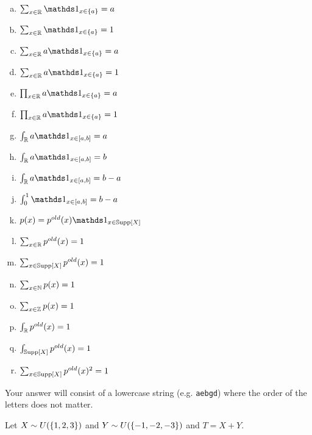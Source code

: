 \documentclass[12pt,landscape]{article}
\newcommand{\instr}{\small Your answer will consist of a lowercase string (e.g. \texttt{aebgd}) where the order of the letters does not matter. \normalsize}
\begin{document}
\begin{enumerate}[(a)]
\item $\sum_{x \in \reals} \indic{x \in \braces{a}} = a$
\item $\sum_{x \in \reals} \indic{x \in \braces{a}} = 1$
\item $\sum_{x \in \reals} a\indic{x \in \braces{a}} = a$
\item $\sum_{x \in \reals} a\indic{x \in \braces{a}} = 1$
\item $\prod_{x \in \reals} a\indic{x \in \braces{a}} = a$
\item $\prod_{x \in \reals} a\indic{x \in \braces{a}} = 1$  

\item $\int_{\reals} a\indic{x \in [a,b]} = a$  
\item $\int_{\reals} a\indic{x \in [a,b]} = b$  
\item $\int_{\reals} a\indic{x \in [a,b]} = b-a$
\item $\int_0^1 \indic{x \in [a,b]} = b-a$



\item $p(x) = p^{old}(x)\indic{x \in \support{X}}$
\item $\sum_{x \in \mathbb{R}} p^{old}(x) = 1$
\item $\sum_{x \in \mathbb{S}\text{upp}\left[X\right]} p^{old}(x) = 1$

\item $\sum_{x \in \mathbb{N}} p(x) = 1$
\item $\sum_{x \in \mathbb{Z}} p(x) = 1$

\item $\int_{\mathbb{R}} p^{old}(x) = 1$
\item $\int_{\mathbb{S}\text{upp}\left[X\right]} p^{old}(x) = 1$

\item $\sum_{x \in \mathbb{S}\text{upp}\left[X\right]} p^{old}(x)^2 = 1$

\end{enumerate}
\eenum\instr\pagebreak


\problem{} Let $X \sim U(\left\{1,2,3\right\})$ and $Y \sim U(\left\{-1,-2,-3\right\})$ and $T = X + Y$.

\vspace{-0.2cm}\benum{} 
\end{document}
